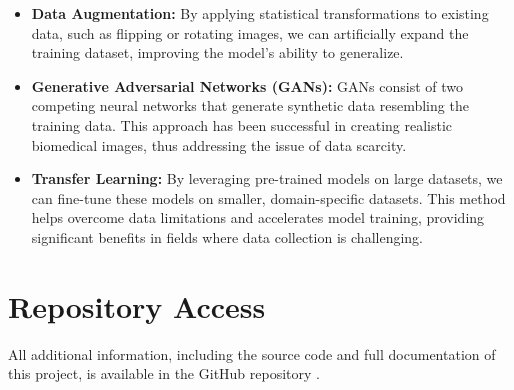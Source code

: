 \documentclass{article}
\begin{document}
\begin{itemize}
	\item \textbf{Data Augmentation:} By applying statistical transformations to existing data, such as flipping or rotating images, we can artificially expand the training dataset, improving the model's ability to generalize.
	
	\item \textbf{Generative Adversarial Networks (GANs):} GANs consist of two competing neural networks that generate synthetic data resembling the training data. This approach has been successful in creating realistic biomedical images, thus addressing the issue of data scarcity.
	
	\item \textbf{Transfer Learning:} By leveraging pre-trained models on large datasets, we can fine-tune these models on smaller, domain-specific datasets. This method helps overcome data limitations and accelerates model training, providing significant benefits in fields where data collection is challenging.
\end{itemize}


\section{Repository Access}

All additional information, including the source code and full documentation of this project, is available in the GitHub repository \cite{cuevas2024github}.


\end{document}
